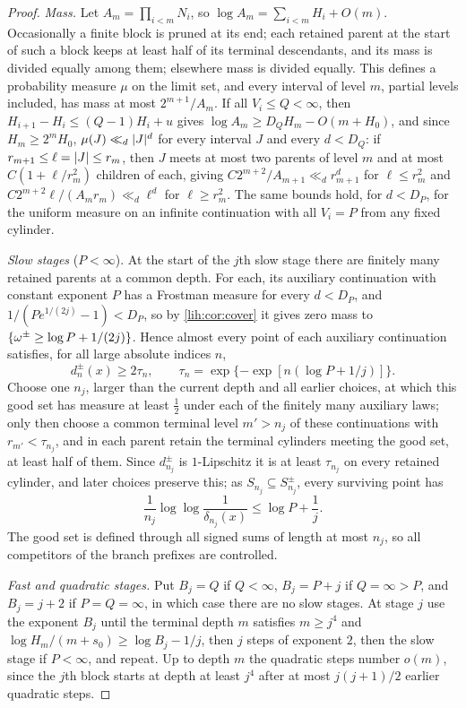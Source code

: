 \begin{proof}
\emph{Mass.} Let $A_m=\prod_{i<m}N_i$, so $\log A_m=\sum_{i<m}H_i+O(m)$. Occasionally a finite block is pruned at
its end; each retained parent at the start of such a block keeps at least half of its terminal
descendants, and its mass is divided equally among them; elsewhere mass is divided equally. This
defines a probability measure $\mu$ on the limit set, and every interval of level $m$, partial levels
included, has mass at most $2^{m+1}/A_m$. If all $V_i\le Q<\infty$, then $H_{i+1}-H_i\le(Q-1)H_i+u$ gives
$\log A_m\ge D_QH_m-O(m+H_0)$, and since $H_m\ge2^mH_0$, $\mu(J)\ll_d\lvert J\rvert^d$ for every interval $J$ and every
$d<D_Q$: if $r_{m+1}\le\ell=\lvert J\rvert\le r_m$, then $J$ meets at most two parents of level $m$ and at most
$C(1+\ell/r_m^2)$ children of each, giving $C2^{m+2}/A_{m+1}\ll_dr_{m+1}^d$ for $\ell\le r_m^2$ and
$C2^{m+2}\ell/(A_mr_m)\ll_d\ell^d$ for $\ell\ge r_m^2$. The same bounds hold, for $d<D_P$, for the uniform measure
on an infinite continuation with all $V_i=P$ from any fixed cylinder.

\emph{Slow stages} ($P<\infty$). At the start of the $j$th slow stage there are finitely many retained
parents at a common depth. For each, its auxiliary continuation with constant exponent $P$ has a
Frostman measure for every $d<D_P$, and $1/(Pe^{1/(2j)}-1)<D_P$, so by \cref{lih:cor:cover} it gives zero mass to
$\{\omega^\pm\ge\log P+1/(2j)\}$. Hence almost every point of each auxiliary continuation satisfies, for all large
absolute indices $n$,
\[
 d_n^\pm(x)\ge2\tau_n,\qquad\tau_n=\exp\{-\exp[n(\log P+1/j)]\}.
\]
Choose one $n_j$, larger than the current depth and all earlier choices, at which this good set has
measure at least $\frac12$ under each of the finitely many auxiliary laws; only then choose a common terminal
level $m'>n_j$ of these continuations with $r_{m'}<\tau_{n_j}$, and in each parent retain the terminal cylinders
meeting the good set, at least half of them. Since $d_{n_j}^\pm$ is $1$-Lipschitz it is at least $\tau_{n_j}$ on every
retained cylinder, and later choices preserve this; as $S_{n_j}\subseteq S_{n_j}^\pm$, every surviving point has
\begin{equation}\label{lih:eq:protect}
 \frac1{n_j}\log\log\frac1{\delta_{n_j}(x)}\le\log P+\frac1j .
\end{equation}
The good set is defined through all signed sums of length at most $n_j$, so all competitors of the branch
prefixes are controlled.

\emph{Fast and quadratic stages.} Put $B_j=Q$ if $Q<\infty$, $B_j=P+j$ if $Q=\infty>P$, and $B_j=j+2$ if
$P=Q=\infty$, in which case there are no slow stages. At stage $j$ use the exponent $B_j$ until the terminal
depth $m$ satisfies $m\ge j^4$ and $\log H_m/(m+s_0)\ge\log B_j-1/j$, then $j$ steps of exponent $2$, then the slow
stage if $P<\infty$, and repeat. Up to depth $m$ the quadratic steps number $o(m)$, since the $j$th block starts
at depth at least $j^4$ after at most $j(j+1)/2$ earlier quadratic steps.


\end{proof}
